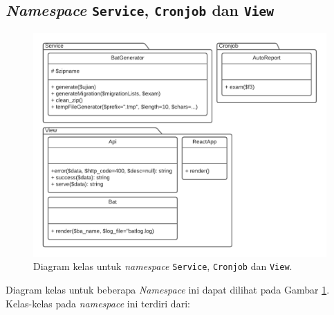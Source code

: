 \subsection{\textit{Namespace} \texttt{Service}, \texttt{Cronjob} dan
\texttt{View}}
    \begin{figure}
        \centering
        \includegraphics[width=0.75\paperwidth]{Gambar/classmap-be/Classmap - app-service,cronjob,view.pdf}
        \caption{Diagram kelas untuk \textit{namespace} \texttt{Service},
            \texttt{Cronjob} dan \texttt{View}.}
        \label{fig:classmap_app-service,cronjob,view}
    \end{figure}
    Diagram kelas untuk beberapa \textit{Namespace} ini dapat dilihat pada
    Gambar \ref{fig:classmap_app-service,cronjob,view}. Kelas-kelas pada
    \textit{namespace} ini terdiri dari:
